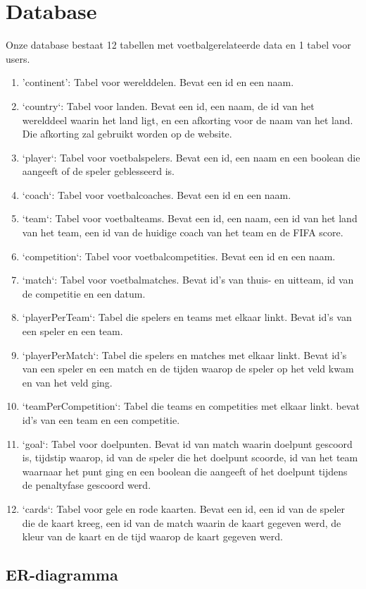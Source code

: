 \documentclass[11pt, a4paper]{article}
\begin{document}
\section{Database}
Onze database bestaat 12 tabellen met voetbalgerelateerde data en 1 tabel voor users.
\begin{enumerate}
\item 'continent': Tabel voor werelddelen. Bevat een id en een naam.
\item `country`: Tabel voor landen. Bevat een id, een naam, de id van het werelddeel waarin het land ligt, en een afkorting voor de naam van het land. Die afkorting zal gebruikt worden op de website.
\item `player`: Tabel voor voetbalspelers. Bevat een id, een naam en een boolean die aangeeft of de speler geblesseerd is.
\item `coach`: Tabel voor voetbalcoaches. Bevat een id en een naam.
\item `team`: Tabel voor voetbalteams. Bevat een id, een naam, een id van het land van het team, een id van de huidige coach van het team en de FIFA score.
\item `competition`: Tabel voor voetbalcompetities. Bevat een id en een naam.
\item `match`: Tabel voor voetbalmatches. Bevat id's van thuis- en uitteam, id van de competitie en een datum.
\item `playerPerTeam`: Tabel die spelers en teams met elkaar linkt. Bevat id's van een speler en een team.
\item `playerPerMatch`: Tabel die spelers en matches met elkaar linkt. Bevat id's van een speler en een match en de tijden waarop de speler op het veld kwam en van het veld ging.
\item `teamPerCompetition`: Tabel die teams en competities met elkaar linkt. bevat id's van een team en een competitie.
\item `goal`: Tabel voor doelpunten. Bevat id van match waarin doelpunt gescoord is, tijdstip waarop, id van de speler die het doelpunt scoorde, id van het team waarnaar het punt ging en een boolean die aangeeft of het doelpunt tijdens de penaltyfase gescoord werd.
\item `cards`: Tabel voor gele en rode kaarten. Bevat een id,	een id van de speler die de kaart kreeg, een id van de match waarin de kaart gegeven werd, de kleur van de kaart en de tijd waarop de kaart gegeven werd.
\end{enumerate}

\subsection{ER-diagramma}
\end{document}
